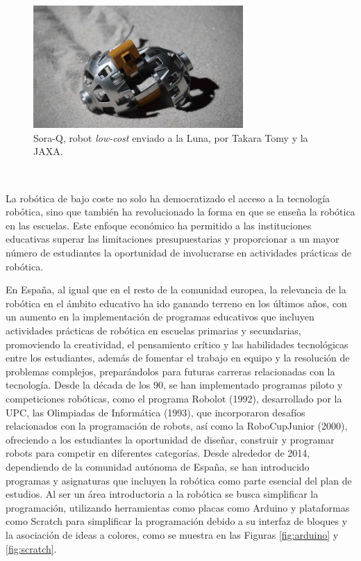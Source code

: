 \begin{figure} [h!]
  \begin{center}
    \includegraphics[width=8cm]{figs/SoraQ_lunar_robot_JAXA}
  \end{center}
  \caption{Sora-Q, robot \textit{low-cost} enviado a la Luna, por Takara Tomy y la JAXA.}
  \label{fig:sora_q}
\end{figure}\

La robótica de bajo coste no solo ha democratizado el acceso a la tecnología
robótica, sino que también ha revolucionado la forma en que se enseña la
robótica en las escuelas.
Este enfoque económico ha permitido a las instituciones educativas superar las
limitaciones presupuestarias y proporcionar a un mayor número de estudiantes la
oportunidad de involucrarse en actividades prácticas de robótica.

En España, al igual que en el resto de la comunidad europea, la relevancia de la
robótica en el ámbito educativo ha ido ganando terreno en los últimos años, con
un aumento en la implementación de programas educativos que incluyen actividades
prácticas de robótica en escuelas primarias y secundarias, promoviendo la
creatividad, el pensamiento crítico y las habilidades tecnológicas entre los
estudiantes, además de fomentar el trabajo en equipo y la resolución de
problemas complejos, preparándolos para futuras carreras relacionadas con la
tecnología.
Desde la década de los 90, se han implementado programas piloto y competiciones
robóticas, como el programa Robolot (1992), desarrollado por la UPC, las
Olimpiadas de Informática (1993), que incorporaron desafíos relacionados con la
programación de robots, así como la RoboCupJunior (2000), ofreciendo a los
estudiantes la oportunidad de diseñar, construir y programar robots para
competir en diferentes categorías.
Desde alrededor de 2014, dependiendo de la comunidad autónoma de España, se han
introducido programas y asignaturas que incluyen la robótica como parte esencial
del plan de estudios.
Al ser un área introductoria a la robótica se busca simplificar la programación,
utilizando herramientas como placas como Arduino y plataformas como Scratch para
simplificar la programación debido a su interfaz de bloques y la asociación de
ideas a colores, como se muestra en las Figuras \ref{fig:arduino} y
\ref{fig:scratch}.

